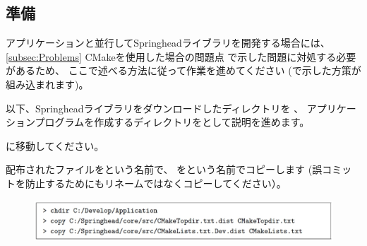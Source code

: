 \subsection{準備}
\label{subsec:PrepareApplication}

\noindent
アプリケーションと並行してSpringheadライブラリを開発する場合には、
\UpKQs \ref{subsec:Problems} CMakeを使用した場合の問題点\UpKQe
で示した問題に対処する必要があるため、
ここで述べる方法に従って作業を進めてください
(で示した方策が組み込まれます)。

\medskip
以下、Springheadライブラリをダウンロードしたディレクトリを\SprTop{} 、
アプリケーションプログラムを作成するディレクトリを\AppTop{}として説明を進めます。

\bigskip
\noindent
\AppTop{}に移動してください。

\bigskip
\noindent
配布されたファイルを\CMakeTopdir{}という名前で、
を\CMakeLists{}という名前でコピーします
(誤コミットを防止するためにもリネームではなくコピーしてください）。

\medskip
\ifLwarp
	\begin{figure}[h]
	    \begin{center}
	    \includegraphics[width=\textwidth]{fig/command-3-1-a.eps}
	    \end{center}
	    \label{fig:DownloadTree}
	\end{figure}
\else
\begin{narrow}[15pt]
\end{narrow}
\fi

